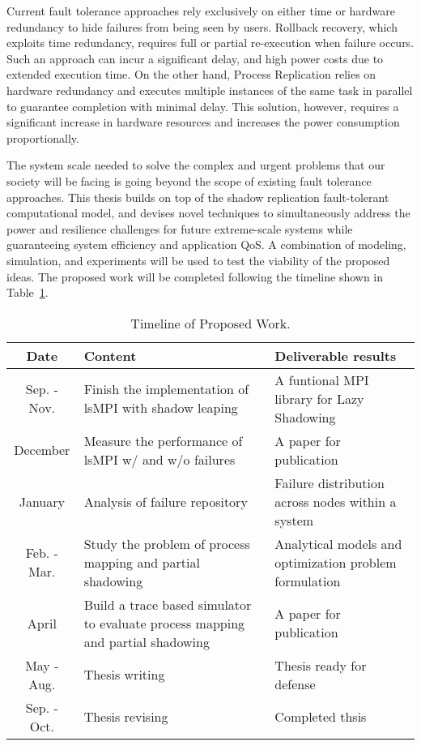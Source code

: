 Current fault tolerance approaches rely exclusively on either time or hardware redundancy to hide failures from being seen by users. 
Rollback recovery, which exploits time redundancy, requires full or partial re-execution when failure occurs.  
Such an approach
can incur a significant delay, %
and high power costs due to extended execution time.
On the other hand, Process Replication relies on hardware redundancy and executes multiple
instances of the same task in parallel to guarantee completion with minimal delay. 
This solution, however, requires a significant increase in hardware resources and increases the power consumption proportionally. 

The system scale needed to solve the complex and urgent problems that our society will be facing is going beyond the scope of existing 
fault tolerance approaches. This thesis builds on top of the shadow replication fault-tolerant computational model, and 
devises novel techniques to simultaneously address the power and resilience challenges for future extreme-scale systems while guaranteeing system efficiency and application QoS. 
A combination of modeling, simulation, and experiments will be used to test the viability of the proposed ideas. The proposed work will be completed following the timeline shown in 
Table~\ref{tab:timeline}.


\begin{table}[ht]
\vspace{-0.3in}
\caption{Timeline of Proposed Work.}
\vspace{-0.15in}
\centering
\scalebox{0.85}
{
\begin{tabularx}{\textwidth}{|c|X|X|}
\toprule
\textbf{Date} & \textbf{Content} & \textbf{Deliverable results} \\
\midrule
Sep. - Nov.  & Finish the implementation of lsMPI with shadow leaping & A funtional MPI library for Lazy Shadowing \\
\hline
December & Measure the performance of lsMPI w/ and w/o failures & A paper for publication \\
\hline
January & Analysis of failure repository & Failure distribution across nodes within a system \\
\hline
Feb. - Mar.  & Study the problem of process mapping and partial shadowing & Analytical models and optimization problem formulation \\
\hline
April  & Build a trace based simulator to evaluate process mapping and partial shadowing & A paper for publication \\ 
\hline
May - Aug. & Thesis writing & Thesis ready for defense \\
\hline
Sep. - Oct. & Thesis revising & Completed thsis \\ 
\bottomrule
\end{tabularx}
}
\label{tab:timeline}
\end{table}





